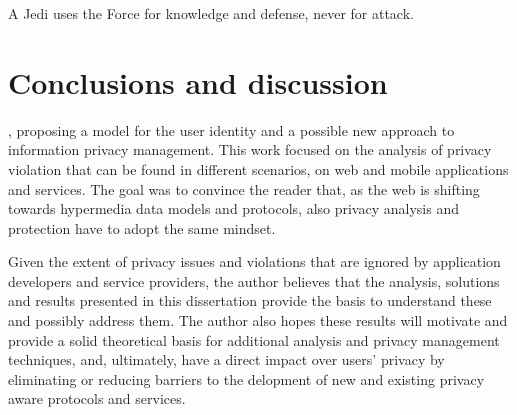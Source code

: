 \begin{savequote}[75mm] 
A Jedi uses the Force for knowledge and defense, never for attack.
\end{savequote}

\chapter{Conclusions and discussion}

, proposing a model for the user identity and a possible new approach to information privacy management. This work focused on the analysis of privacy violation that can be found in different scenarios, on web and mobile applications and services.
The goal was to convince the reader that, as the web is shifting towards hypermedia data models and protocols, also privacy analysis and protection have to adopt the same mindset.

Given the extent of privacy issues and violations that are ignored by application developers and service providers, the author believes that the analysis, solutions and results presented in this dissertation provide the basis to understand these and possibly address them.
The author also hopes these results will motivate and provide a solid theoretical basis for additional analysis and privacy management techniques, and, ultimately, have a direct impact over users' privacy by eliminating or reducing barriers to the delopment of new and existing privacy aware protocols and services.
